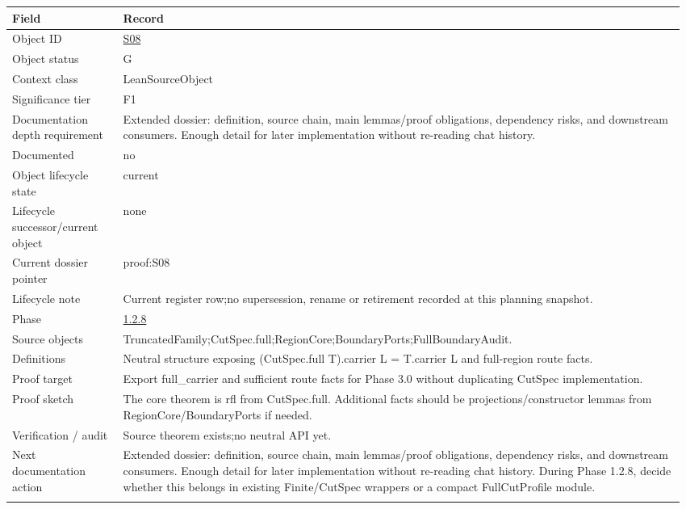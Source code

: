 \begin{longtable}{L{0.16\linewidth} L{0.81\linewidth}}
\hline
\textbf{Field} & \textbf{Record}\\
\hline
Object ID & \hyperlink{object-row-S08}{S08}\\
\hline\addlinespace[0.20em]
Object status & G\\
\hline\addlinespace[0.20em]
Context class & LeanSourceObject\\
\hline\addlinespace[0.20em]
Significance tier & F1\\
\hline\addlinespace[0.20em]
Documentation depth requirement & Extended dossier: definition, source chain, main lemmas/\allowbreak{}proof obligations, dependency risks, and downstream consumers. Enough detail for later implementation without re-reading chat history.\\
\hline\addlinespace[0.20em]
Documented & no\\
\hline\addlinespace[0.20em]
Object lifecycle state & current\\
\hline\addlinespace[0.20em]
Lifecycle successor/\allowbreak{}current object & none\\
\hline\addlinespace[0.20em]
Current dossier pointer & proof:S08\\
\hline\addlinespace[0.20em]
Lifecycle note & Current register row;\newline no supersession, rename or retirement recorded at this planning snapshot.\\
\hline\addlinespace[0.20em]
Phase & \hyperlink{phase-row-1-2-8}{1.2.8}\\
\hline\addlinespace[0.20em]
Source objects & TruncatedFamily;\newline CutSpec.full;\newline RegionCore;\newline BoundaryPorts;\newline FullBoundaryAudit.\\
\hline\addlinespace[0.20em]
Definitions & Neutral structure exposing (CutSpec.full T).carrier L = T.carrier L and full-region route facts.\\
\hline\addlinespace[0.20em]
Proof target & Export full\_carrier and sufficient route facts for Phase 3.0 without duplicating CutSpec implementation.\\
\hline\addlinespace[0.20em]
Proof sketch & The core theorem is rfl from CutSpec.full. Additional facts should be projections/\allowbreak{}constructor lemmas from RegionCore/\allowbreak{}BoundaryPorts if needed.\\
\hline\addlinespace[0.20em]
Verification /\allowbreak{} audit & Source theorem exists;\newline no neutral API yet.\\
\hline\addlinespace[0.20em]
Next documentation action & Extended dossier: definition, source chain, main lemmas/\allowbreak{}proof obligations, dependency risks, and downstream consumers. Enough detail for later implementation without re-reading chat history. During Phase 1.2.8, decide whether this belongs in existing Finite/\allowbreak{}CutSpec wrappers or a compact FullCutProfile module.\\
\hline\addlinespace[0.20em]
\end{longtable}
